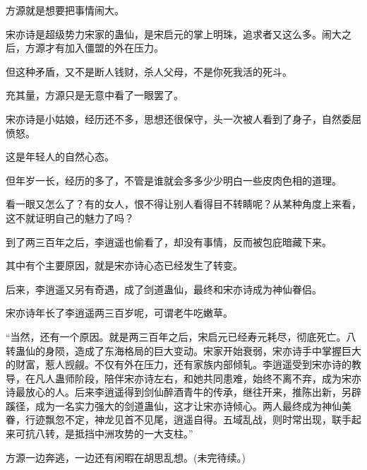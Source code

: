 \begin{this_body}
方源就是想要把事情闹大。

宋亦诗是超级势力宋家的蛊仙，是宋启元的掌上明珠，追求者又这么多。闹大之后，方源才有加入僵盟的外在压力。

但这种矛盾，又不是断人钱财，杀人父母，不是你死我活的死斗。

充其量，方源只是无意中看了一眼罢了。

宋亦诗是小姑娘，经历还不多，思想还很保守，头一次被人看到了身子，自然委屈愤怒。

这是年轻人的自然心态。

但年岁一长，经历的多了，不管是谁就会多多少少明白一些皮肉色相的道理。

看一眼又怎么了？有的女人，恨不得让别人看得目不转睛呢？从某种角度上来看，这不就证明自己的魅力了吗？

到了两三百年之后，李逍遥也偷看了，却没有事情，反而被包庇暗藏下来。

其中有个主要原因，就是宋亦诗心态已经发生了转变。

后来，李逍遥又另有奇遇，成了剑道蛊仙，最终和宋亦诗成为神仙眷侣。

宋亦诗年长了李逍遥两三百岁呢，可谓老牛吃嫩草。

“当然，还有一个原因。就是两三百年之后，宋启元已经寿元耗尽，彻底死亡。八转蛊仙的身陨，造成了东海格局的巨大变动。宋家开始衰弱，宋亦诗手中掌握巨大的财富，惹人觊觎。不仅有外在压力，还有家族内部倾轧。李逍遥受到宋亦诗的教导，在凡人蛊师阶段，陪伴宋亦诗左右，和她共同患难，始终不离不弃，成为宋亦诗最放心的人。后来李逍遥得到剑仙醉酒青牛的传承，继往开来，推陈出新，另辟蹊径，成为一名实力强大的剑道蛊仙，这才让宋亦诗倾心。两人最终成为神仙美眷，行迹飘忽不定，神龙见首不见尾，逍遥自得。五域乱战，则时常出现，联手起来可抗八转，是抵挡中洲攻势的一大支柱。”

方源一边奔逃，一边还有闲暇在胡思乱想。(未完待续。)

\end{this_body}

